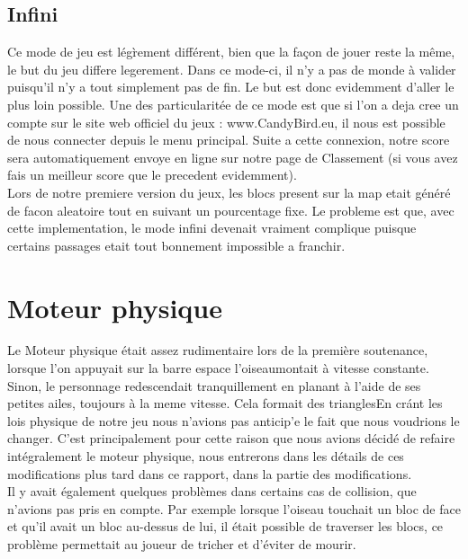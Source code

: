 \documentclass [11pt]{report}
\begin{document}
			\vspace{10mm}
			
			
			
			\subsection{Infini}
			Ce mode de jeu est lég\`rement différent, bien que la façon de jouer reste la m\^eme, le but du jeu differe legerement. Dans ce mode-ci, il n'y a pas de monde \`a valider puisqu'il n'y a tout simplement pas de fin. Le but est donc evidemment d'aller le plus loin possible. Une des particularitée de ce mode est que si l'on a deja cree un compte sur le site web officiel du jeux : www.CandyBird.eu, il nous est possible de nous connecter depuis le menu principal. Suite a cette connexion, notre score sera automatiquement envoye en ligne sur notre page de Classement (si vous avez fais un meilleur score que le precedent evidemment).\\
			
			Lors de notre premiere version du jeux, les blocs present sur la map etait généré de facon aleatoire tout en suivant un pourcentage fixe. Le probleme est que, avec cette implementation, le mode infini devenait vraiment complique puisque certains passages etait tout bonnement impossible a franchir. 
			
			\vspace{10mm}
			
	\section{Moteur physique}
	
	\vspace{5mm}
	
		\indent Le Moteur physique était assez rudimentaire lors de la premi\`ere soutenance, lorsque l'on appuyait sur la barre espace l'oiseaumontait \`a vitesse constante. Sinon, le personnage redescendait tranquillement en planant \`a l'aide de ses petites ailes, toujours \`a la meme vitesse. Cela formait des trianglesEn cr\'ant les lois physique de notre jeu nous n'avions pas anticip'e le fait que nous voudrions le changer. C'est principalement pour cette raison que nous avions décidé de refaire intégralement le moteur physique, nous entrerons dans les détails de ces modifications plus tard dans ce rapport, dans la partie des modifications.\\
		
		\indent Il y avait également quelques probl\`emes dans certains cas de collision, que n'avions pas pris en compte. Par exemple lorsque l'oiseau touchait un bloc de face et qu'il avait un bloc au-dessus de lui, il était possible de traverser les blocs, ce probl\`eme permettait au joueur de tricher et d'éviter de mourir.\\
		
\end{document}
